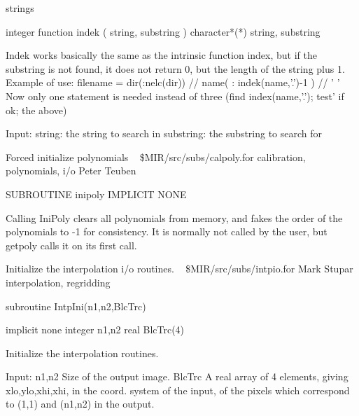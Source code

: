 \newline {} strings
\par{\tenpoint
{\eightpoint\begintt
      integer function indek ( string, substring )
      character*(*) string, substring

 Indek works basically the same as the intrinsic function index, but if the
 substring is not found, it does not return 0, but the length of the string
 plus 1.
 Example of use:
 filename = dir(:nelc(dir)) // name( : indek(name,'.')-1 ) // ' '
 Now only one statement is needed instead of three (find index(name,'.'); test'
 if ok; the above)

 Input:
   string:      the string to search in
   substring:   the substring to search for
\endtt}
\par}
%
\noindent Forced initialize polynomials
\newline \ 
\newline {} \$MIR/src/subs/calpoly.for
\newline {} calibration, polynomials, i/o
\newline {} Peter Teuben
\par{\tenpoint
{\eightpoint\begintt
        SUBROUTINE inipoly
        IMPLICIT NONE

       Calling IniPoly clears all polynomials from memory, and fakes
       the order of the polynomials to -1 for consistency.
       It is normally not called by the user, but getpoly calls it
       on its first call.
\endtt}
\par}
%
\noindent Initialize the interpolation i/o routines.
\newline \ 
\newline {} \$MIR/src/subs/intpio.for
\newline {} Mark Stupar
\newline \abox{Keywords:} interpolation, regridding
\par{\tenpoint
{\eightpoint\begintt
        subroutine IntpIni(n1,n2,BlcTrc)

        implicit none
        integer n1,n2
        real BlcTrc(4)

  Initialize the interpolation routines.

  Input:
    n1,n2      Size of the output image.
    BlcTrc     A real array of 4 elements, giving xlo,ylo,xhi,xhi,
               in the coord. system of the input, of the pixels which
               correspond to (1,1) and (n1,n2) in the output.
\endtt}
\par}
